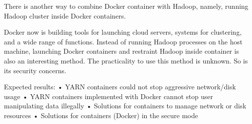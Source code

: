 There is another way to combine Docker container with Hadoop, namely, running Hadoop cluster inside Docker containers.

Docker now is building tools for launching cloud servers, systems for clustering, and a wide range of functions. Instead of running Hadoop processes on the host machine, launching Docker containers and restraint Hadoop inside container is also an interesting method. The practicality to use this method is unknown. So is its security concerns.

Expected results:
•	YARN containers could not stop aggressive network/disk usage
•	YARN containers implemented with Docker cannot stop user manipulating data illegally
•	Solutions for containers to manage network or disk resources
•	Solutions for containers (Docker) in the secure mode
